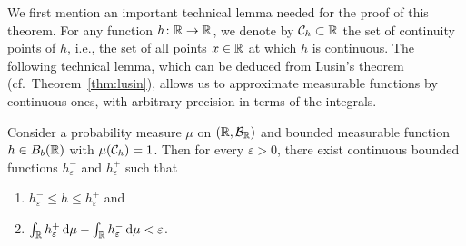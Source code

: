 

We first mention an important technical lemma needed for the proof of this theorem. For any function $h\colon \mathbb R \to \mathbb R$, we denote by $\mathcal C_h \subset \mathbb R$ the set of continuity points of $h$, i.e., the set of all points $x\in \mathbb R$ at which $h$ is continuous. The following technical lemma, which can be deduced from Lusin's theorem (cf.~Theorem~\ref{thm:lusin}), allows us to approximate measurable functions by continuous ones, with arbitrary precision in terms of the integrals. 

\begin{lemma}
Consider a probability measure $\mu$ on $(\mathbb R, \mathcal B_{\mathbb R})$ and bounded measurable function $h\in B_b(\mathbb R)$ with $\mu(\mathcal C_h) = 1$. Then for every $\varepsilon > 0$, there exist continuous bounded functions $h^-_\varepsilon$ and $h^+_\varepsilon$ such that
\begin{enumerate}[label={(\arabic*)}]
\item $h^-_\varepsilon \le h \le h^+_\varepsilon$ and
\item $\int_{\mathbb R} h^+_\varepsilon \, \mathrm{d} \mu - \int_{\mathbb R} h^-_\varepsilon \, \mathrm{d} \mu < \varepsilon$.
\end{enumerate} 
\end{lemma}
